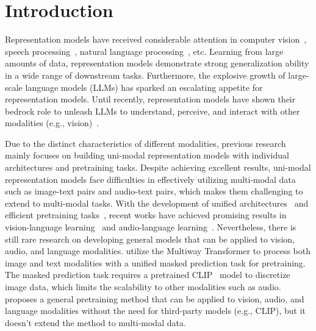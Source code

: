 \section{Introduction}
\label{sec:intro}

Representation models have received considerable attention in computer vision~\cite{beit,mae,ibot,moco,mocov2,mocov3,simclr,dino,dinov2}, speech processing~\cite{wav2vec,wav2vec2,wavlm,hubert}, natural language processing~\cite{elmo,bert,roberta,electra,deberta}, etc. 
Learning from large amounts of data, representation models demonstrate strong generalization ability in a wide range of downstream tasks.
Furthermore, the explosive growth of large-scale language models (LLMs) has sparked an escalating appetite for representation models.
Until recently, representation models have shown their bedrock role to unleash LLMs to understand, perceive, and interact with other modalities (e.g., vision)~\cite{gpt4,kosmos,blip2,minigpt4,llava,mplug-owl,palme}.

Due to the distinct characteristics of different modalities, previous research mainly focuses on building uni-modal representation models with individual architectures and pretraining tasks.
Despite achieving excellent results, uni-modal representation models face difficulties in effectively utilizing multi-modal data such as image-text pairs and audio-text pairs, which makes them challenging to extend to multi-modal tasks.
With the development of unified architectures~\cite{transformer,vit,perceiver,perceiverio} and efficient pretraining tasks~\cite{bert,beit,mae,clip}, recent works have achieved promising results in vision-language learning~\cite{ofa,flamingo,coca,beit3,blip,pali} and audio-language learning~\cite{audioclip,wav2clip,clap,speecht5}. Nevertheless, there is still rare research on developing general models that can be applied to vision, audio, and language modalities.
\cite{beit3} utilize the Multiway Transformer to process both image and text modalities with a unified masked prediction task for pretraining. The masked prediction task requires a pretrained CLIP~\cite{clip} model to discretize image data, which limits the scalability to other modalities such as audio.
\cite{data2vec} proposes a general pretraining method that can be applied to vision, audio, and language modalities without the need for third-party models (e.g., CLIP), but it doesn't extend the method to multi-modal data.

